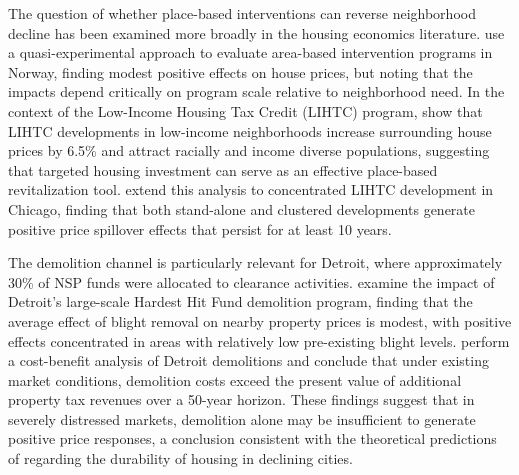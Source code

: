 \documentclass[12pt,authoryear]{elsarticle}
\begin{document}
The question of whether place-based interventions can reverse neighborhood decline has been examined more broadly in the housing economics literature. \citet{aarland2017} use a quasi-experimental approach to evaluate area-based intervention programs in Norway, finding modest positive effects on house prices, but noting that the impacts depend critically on program scale relative to neighborhood need. In the context of the Low-Income Housing Tax Credit (LIHTC) program, \citet{diamond2019} show that LIHTC developments in low-income neighborhoods increase surrounding house prices by 6.5\% and attract racially and income diverse populations, suggesting that targeted housing investment can serve as an effective place-based revitalization tool. \citet{voith2022} extend this analysis to concentrated LIHTC development in Chicago, finding that both stand-alone and clustered developments generate positive price spillover effects that persist for at least 10 years.

The demolition channel is particularly relevant for Detroit, where approximately 30\% of NSP funds were allocated to clearance activities. \citet{alvayay2023} examine the impact of Detroit's large-scale Hardest Hit Fund demolition program, finding that the average effect of blight removal on nearby property prices is modest, with positive effects concentrated in areas with relatively low pre-existing blight levels. \citet{paredes2017} perform a cost-benefit analysis of Detroit demolitions and conclude that under existing market conditions, demolition costs exceed the present value of additional property tax revenues over a 50-year horizon. These findings suggest that in severely distressed markets, demolition alone may be insufficient to generate positive price responses, a conclusion consistent with the theoretical predictions of \citet{glaeser2005} regarding the durability of housing in declining cities.
\end{document}
